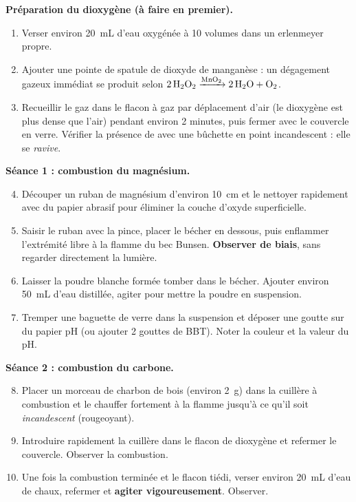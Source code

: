 \documentclass[11pt]{article}
\newcounter{popsec}
\newcounter{popsub}
\newcommand{\courssub}[1]{%
  \stepcounter{popsub}%
  \par\vspace{9pt}\noindent{\popxbold\fontsize{11.5}{13}\selectfont\color{popink}{\color{poporange}\thepopsec.\thepopsub}\hspace{6pt}#1}\par\nopagebreak\vspace{4pt}
}
\begin{document}
\courssub{Protocole}

\textbf{Préparation du dioxygène (à faire en premier).}

\begin{enumerate}
\item Verser environ \SI{20}{mL} d'eau oxygénée à 10 volumes dans un erlenmeyer propre.
\item Ajouter une pointe de spatule de dioxyde de manganèse  : un dégagement gazeux immédiat se produit selon $\ce{2H2O2 ->[MnO2] 2H2O + O2}$.
\item Recueillir le gaz dans le flacon à gaz par déplacement d'air (le dioxygène est plus dense que l'air) pendant environ 2 minutes, puis fermer avec le couvercle en verre. Vérifier la présence de  avec une bûchette en point incandescent : elle se \emph{ravive}.
\end{enumerate}

\textbf{Séance 1 : combustion du magnésium.}

\begin{enumerate}
\setcounter{enumi}{3}
\item Découper un ruban de magnésium d'environ \SI{10}{cm} et le nettoyer rapidement avec du papier abrasif pour éliminer la couche d'oxyde superficielle.
\item Saisir le ruban avec la pince, placer le bécher en dessous, puis enflammer l'extrémité libre à la flamme du bec Bunsen. \textbf{Observer de biais}, sans regarder directement la lumière.
\item Laisser la poudre blanche formée tomber dans le bécher. Ajouter environ \SI{50}{mL} d'eau distillée, agiter pour mettre la poudre en suspension.
\item Tremper une baguette de verre dans la suspension et déposer une goutte sur du papier pH (ou ajouter 2 gouttes de BBT). Noter la couleur et la valeur du pH.
\end{enumerate}

\textbf{Séance 2 : combustion du carbone.}

\begin{enumerate}
\setcounter{enumi}{7}
\item Placer un morceau de charbon de bois (environ \SI{2}{g}) dans la cuillère à combustion et le chauffer fortement à la flamme jusqu'à ce qu'il soit \emph{incandescent} (rougeoyant).
\item Introduire rapidement la cuillère dans le flacon de dioxygène et refermer le couvercle. Observer la combustion.
\item Une fois la combustion terminée et le flacon tiédi, verser environ \SI{20}{mL} d'eau de chaux, refermer et \textbf{agiter vigoureusement}. Observer.
\end{enumerate}
\end{document}
